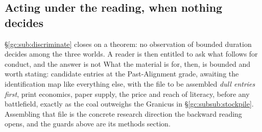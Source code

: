 \documentclass[11pt]{article}
\numberwithin{equation}{section}
\theoremstyle{plain}
\theoremstyle{definition}
\theoremstyle{remark}
\begin{document}
\subsection{Acting under the reading, when nothing decides}
\label{gc:sub:acting}

\S\ref{gc:sub:discriminate} closes on a theorem: no observation of
bounded duration decides among the three worlds. A reader is then
entitled to ask what follows for conduct, and the answer is not What the material is for, then, is bounded and worth stating: candidate
entries at the Past-Alignment grade, awaiting the identification map
like everything else, with the file to be assembled \emph{dull entries
first}, print economics, paper supply, the price and reach of
literacy, before any battlefield, exactly as the coal outweighs the
Granicus in \S\ref{gc:subsub:stockpile}. Assembling that file is the
concrete research direction the backward reading opens, and the guards
above are its methods section.
\end{document}
